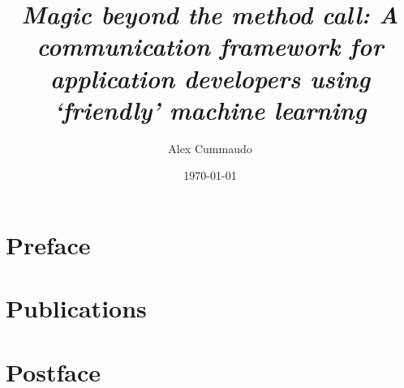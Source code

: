 \documentclass[twoside,12pt,titlepage]{book}
\title{
  \itshape Magic beyond the method call:            %
  \upshape A communication framework                %
           for application developers               %
           using `friendly' machine learning        %
}
\author{Alex Cummaudo}
\date{\today}
\begin{document}
\frontmatter






\mainmatter

\part{Preface}
\begin{bibunit}
  
  
  
  
\end{bibunit}

\part{Publications}



\part{Postface}
\begin{bibunit}
  
\end{bibunit}

\appendix

\end{document}
